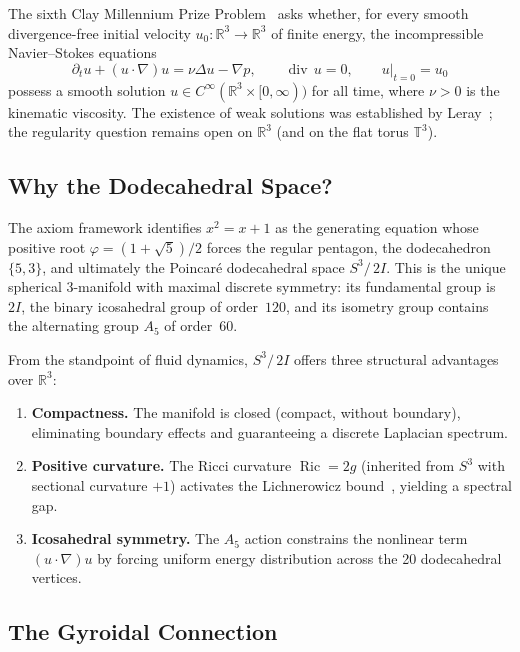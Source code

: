 \documentclass[11pt,a4paper]{article}
\theoremstyle{plain}
\theoremstyle{definition}
\DeclareMathOperator{\Ric}{Ric}
\DeclareMathOperator{\dv}{div}
\newcommand{\R}{\mathbb{R}}
\newcommand{\phig}{\varphi}              %
\newcommand{\Lap}{\Delta}                 %
\newcommand{\DS}{S^3\!/\,2I}             %
\newcommand{\BI}{2I}                      %
\begin{document}
The sixth Clay Millennium Prize Problem~\cite{Fefferman} asks whether, for
every smooth divergence-free initial velocity $u_0 : \R^3 \to \R^3$ of finite
energy, the incompressible Navier--Stokes equations
\begin{equation}\label{eq:NS-R3}
  \partial_t u + (u \cdot \nabla) u = \nu \Lap u - \nabla p, \qquad
  \dv\, u = 0, \qquad
  u\big|_{t=0} = u_0
\end{equation}
possess a smooth solution $u \in C^\infty(\R^3 \times [0,\infty))$ for all
time, where $\nu > 0$ is the kinematic viscosity.  The existence of weak
solutions was established by Leray~\cite{Leray}; the regularity question
remains open on $\R^3$ (and on the flat torus $\mathbb{T}^3$).

\subsection{Why the Dodecahedral Space?}

The axiom framework identifies $x^2 = x + 1$ as the generating equation whose
positive root $\phig = (1+\sqrt{5})/2$ forces the regular pentagon, the
dodecahedron $\{5,3\}$, and ultimately the Poincar\'{e} dodecahedral space
$\DS$.  This is the unique spherical $3$-manifold with maximal discrete
symmetry: its fundamental group is $\BI$, the binary icosahedral group of
order~$120$, and its isometry group contains the alternating group $A_5$ of
order~$60$.

From the standpoint of fluid dynamics, $\DS$ offers three structural
advantages over $\R^3$:
\begin{enumerate}[nosep]
  \item \textbf{Compactness.}  The manifold is closed (compact, without
        boundary), eliminating boundary effects and guaranteeing a discrete
        Laplacian spectrum.
  \item \textbf{Positive curvature.}  The Ricci curvature
        $\Ric = 2g$ (inherited from $S^3$ with sectional curvature $+1$)
        activates the Lichnerowicz bound~\cite{Lichnerowicz}, yielding a spectral gap.
  \item \textbf{Icosahedral symmetry.}  The $A_5$ action constrains the
        nonlinear term $(u \cdot \nabla) u$ by forcing uniform energy
        distribution across the 20 dodecahedral vertices.
\end{enumerate}

\subsection{The Gyroidal Connection}
\end{document}
